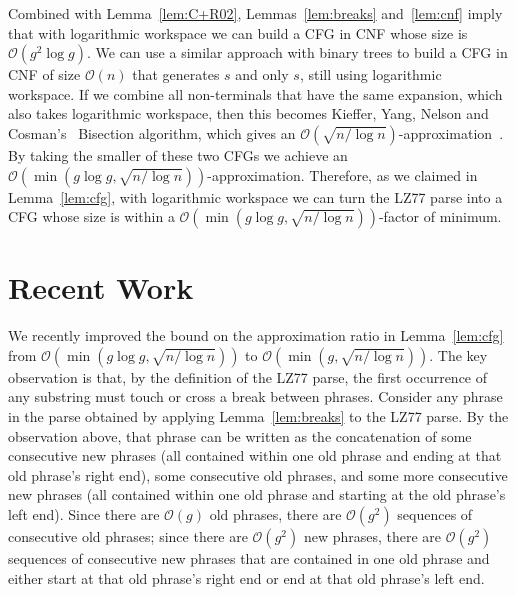 \documentclass[runningheads]{llncs}
\newcommand{\Oh}[1]
    {\ensuremath{\mathcal{O}\!\left( {#1} \right)}}
\begin{document}
Combined with Lemma~\ref{lem:C+R02}, Lemmas~\ref{lem:breaks} and~\ref{lem:cnf} imply that with logarithmic workspace we can build a CFG in CNF whose size is $\Oh{g^2 \log g}$.  We can use a similar approach with binary trees to build a CFG in CNF of size $\Oh{n}$ that generates $s$ and only $s$, still using logarithmic workspace.  If we combine all non-terminals that have the same expansion, which also takes logarithmic workspace, then this becomes Kieffer, Yang, Nelson and Cosman's~\cite{KYNC00} {\sc Bisection} algorithm, which gives an $\Oh{\sqrt{n / \log n}}$-approximation~\cite{CLLP+05}.  By taking the smaller of these two CFGs we achieve an $\Oh{\min \left( g \log g, \sqrt{n / \log n} \right)}$-approximation.  Therefore, as we claimed in Lemma~\ref{lem:cfg}, with logarithmic workspace we can turn the LZ77 parse into a CFG whose size is within a $\Oh{\min \left( g \log g, \sqrt{n / \log n} \right)}$-factor of minimum.

\section{Recent Work} \label{sec:recent}

We recently improved the bound on the approximation ratio in Lemma~\ref{lem:cfg} from $\Oh{\min \left( g \log g, \sqrt{n / \log n} \right)}$ to $\Oh{\min \left( g, \sqrt{n / \log n} \right)}$.  The key observation is that, by the definition of the LZ77 parse, the first occurrence of any substring must touch or cross a break between phrases.  Consider any phrase in the parse obtained by applying Lemma~\ref{lem:breaks} to the LZ77 parse.  By the observation above, that phrase can be written as the concatenation of some consecutive new phrases (all contained within one old phrase and ending at that old phrase's right end), some consecutive old phrases, and some more consecutive new phrases (all contained within one old phrase and starting at the old phrase's left end).  Since there are $\Oh{g}$ old phrases, there are $\Oh{g^2}$ sequences of consecutive old phrases; since there are $\Oh{g^2}$ new phrases, there are $\Oh{g^2}$ sequences of consecutive new phrases that are contained in one old phrase and either start at that old phrase's right end or end at that old phrase's left end.
\end{document}
